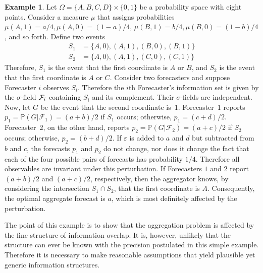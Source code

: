 \documentclass[11pt]{article}
\renewcommand{\P}{\mathbb{P}}
\theoremstyle{definition}
\newtheorem{example}[theorem]{Example}
\theoremstyle{definition}
\def\F{{\cal F}}
\def\P{{\mathbb P}}
\def\ee{\varepsilon}
\begin{document}
\begin{example}
Let $\Omega = \{ A,B,C,D \} \times \{ 0,1 \}$ be a probability space
with eight points.  Consider a measure $\mu$ that assigns
probabilities $\mu (A,1) = a/4, \mu (A,0) = (1-a)/4$, $\mu (B,1) =
b/4, \mu (B,0) = (1-b)/4$, and so forth. Define two events
\begin{align*}
 S_1 &= \{A,0),(A,1),(B,0),(B,1) \}\\
 S_2 &= \{A,0),(A,1),(C,0),(C,1) \}
\end{align*}
Therefore, $S_1$ is the event that the first coordinate is
$A$ or $B$, and $S_2$ is the event that the first coordinate
is $A$ or $C$. Consider two forecasters and suppose Forecaster $i$ observes $S_i$. Therefore the $i$th Forecaster's information set is
given by the $\sigma$-field $\F_i$ containing $S_i$ and its
complement. Their $\sigma$-fields are independent. Now, let
$G$ be the event that the second coordinate is~1.  Forecaster~1
reports $p_1 = \P(G | \mathcal{F}_1) = (a+b)/2$ if $S_1$ occurs;
otherwise, $p_1 = (c+d)/2$.  Forecaster~2, on the other hand, reports
$p_2 = \P(G | \mathcal{F}_2) = (a+c)/2$ if $S_2$ occurs; otherwise,
$p_2 = (b+d)/2$.  If $\ee$ is added to $a$ and $d$ but subtracted from
$b$ and $c$, the forecasts $p_1$ and $p_2$ do not change, nor does it
change the fact that each of the four possible pairs of forecasts has
probability $1/4$.  Therefore all observables are invariant under
this perturbation.  If Forecasters $1$ and $2$ report $(a+b)/2$ and
$(a+c)/2$, respectively, then the aggregator knows, by considering the
intersection $S_1 \cap S_2$, that the first coordinate is $A$.
Consequently, the optimal aggregate forecast is $a$, which is most
definitely affected by the perturbation.
\end{example}

The point of this example is to show that the aggregation problem is affected
by the fine structure of information overlap.  It is, however, unlikely
that the structure can ever be known with the precision postulated in
this simple example.  Therefore it is necessary to make reasonable
assumptions that yield plausible yet generic information structures.
\end{document}
